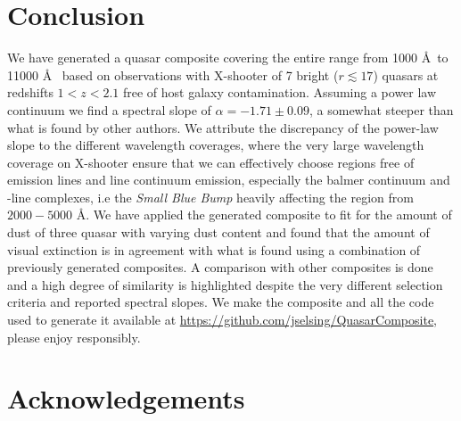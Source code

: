 \documentclass{aa}    %
\newcommand{\sectlabel}[1]{\label{sect:#1}}
\newcommand{\feii}{\ion{Fe}{ii}}
\begin{document}
{\section{Conclusion}  \sectlabel{conclusion}




We have generated a quasar composite covering the entire range from 1000 \AA~to 11000 \AA~ based on observations with X-shooter of 7 bright ($r \lesssim 17$) quasars at redshifts $1 < z < 2.1$ free of host galaxy contamination. Assuming a power law continuum we find a spectral slope of $\alpha = -1.71 \pm 0.09$, a somewhat steeper than what is found by other authors. We attribute the discrepancy of the power-law slope to the different wavelength coverages, where the very large wavelength coverage on X-shooter ensure that we can effectively choose regions free of emission lines and line continuum emission, especially the balmer continuum and \feii-line complexes, i.e the \textit{Small Blue Bump} heavily affecting the region from $2000 - 5000$ \AA. We have applied the generated composite to fit for the amount of dust of three quasar with varying dust content and found that the amount of visual extinction is in agreement with what is found using a combination of previously generated composites. A comparison with other composites is done and a high degree of similarity is highlighted despite the very different selection criteria and reported spectral slopes. We make the composite and all the code used to generate it available at \url{https://github.com/jselsing/QuasarComposite}, please enjoy responsibly.



\section{Acknowledgements}  \sectlabel{Acknowledgements}







 





\appendix

}
\end{document}
